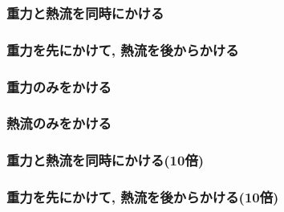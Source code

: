 \subsubsection{重力と熱流を同時にかける}



\subsubsection{重力を先にかけて, 熱流を後からかける}



\subsubsection{重力のみをかける}



\subsubsection{熱流のみをかける}



\subsubsection{重力と熱流を同時にかける(10倍)}

\subsubsection{重力を先にかけて, 熱流を後からかける(10倍)}



